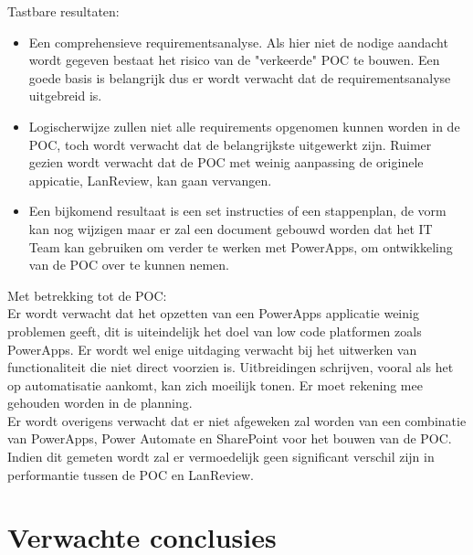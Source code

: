 Tastbare resultaten:
\begin{itemize}
    \item Een comprehensieve requirementsanalyse. Als hier niet de nodige aandacht wordt gegeven bestaat het risico van de "verkeerde" POC te bouwen. Een goede basis is belangrijk dus er wordt verwacht dat de requirementsanalyse uitgebreid is.
    \item Logischerwijze zullen niet alle requirements opgenomen kunnen worden in de POC, toch wordt verwacht dat de belangrijkste uitgewerkt zijn. Ruimer gezien wordt verwacht dat de POC met weinig aanpassing de originele appicatie, LanReview, kan gaan vervangen.
    \item Een bijkomend resultaat is een set instructies of een stappenplan, de vorm kan nog wijzigen maar er zal een document gebouwd worden dat het IT Team kan gebruiken om verder te werken met PowerApps, om ontwikkeling van de POC over te kunnen nemen.
\end{itemize}


\vspace{5mm}

Met betrekking tot de POC:\\
Er wordt verwacht dat het opzetten van een PowerApps applicatie weinig problemen geeft, dit is uiteindelijk het doel van low code platformen zoals PowerApps. Er wordt wel enige uitdaging verwacht bij het uitwerken van functionaliteit die niet direct voorzien is. Uitbreidingen schrijven, vooral als het op automatisatie aankomt, kan zich moeilijk tonen. Er moet rekening mee gehouden worden in de planning.\\
Er wordt overigens verwacht dat er niet afgeweken zal worden van een combinatie van PowerApps, Power Automate en SharePoint voor het bouwen van de POC.\\
Indien dit gemeten wordt zal er vermoedelijk geen significant verschil zijn in performantie tussen de POC en LanReview.

\section{Verwachte conclusies}
\label{sec:verwachte_conclusies}

